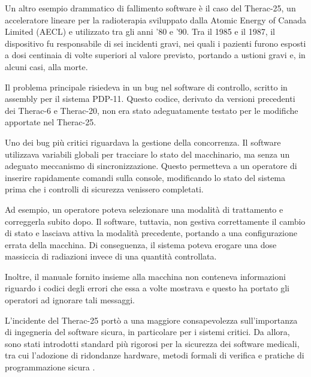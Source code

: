 Un altro esempio drammatico di fallimento software è il caso del Therac-25, un acceleratore lineare per la radioterapia sviluppato dalla Atomic Energy of Canada Limited (AECL) e utilizzato tra gli anni '80 e '90. Tra il 1985 e il 1987, il dispositivo fu responsabile di sei incidenti gravi, nei quali i pazienti furono esposti a dosi centinaia di volte superiori al valore previsto, portando a ustioni gravi e, in alcuni casi, alla morte.

Il problema principale risiedeva in un bug nel software di controllo, scritto in assembly per il sistema PDP-11. Questo codice, derivato da versioni precedenti dei Therac-6 e Therac-20, non era stato adeguatamente testato per le modifiche apportate nel Therac-25.

Uno dei bug più critici riguardava la gestione della concorrenza. Il software utilizzava variabili globali per tracciare lo stato del macchinario, ma senza un adeguato meccanismo di sincronizzazione. Questo permetteva a un operatore di inserire rapidamente comandi sulla console, modificando lo stato del sistema prima che i controlli di sicurezza venissero completati.

Ad esempio, un operatore poteva selezionare una modalità di trattamento e correggerla subito dopo. Il software, tuttavia, non gestiva correttamente il cambio di stato e lasciava attiva la modalità precedente, portando a una configurazione errata della macchina. Di conseguenza, il sistema poteva erogare una dose massiccia di radiazioni invece di una quantità controllata.

Inoltre, il manuale fornito insieme alla macchina non conteneva informazioni riguardo i codici degli errori che essa a volte mostrava e questo ha portato gli operatori ad ignorare tali messaggi.

L'incidente del Therac-25 portò a una maggiore consapevolezza sull'importanza di ingegneria del software sicura, in particolare per i sistemi critici. Da allora, sono stati introdotti standard più rigorosi per la sicurezza dei software medicali, tra cui l’adozione di ridondanze hardware, metodi formali di verifica e pratiche di programmazione sicura \cite{Leveson1993}.
